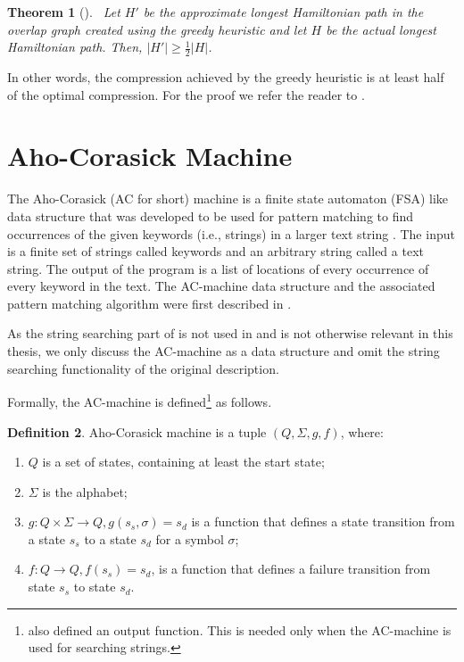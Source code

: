 \documentclass[english,twoside,censored,csm,algorithms-track-2020]{HYthesisML}
\theoremstyle{plain}
\newtheorem{theorem}{Theorem}[chapter]
\theoremstyle{definition}
\newtheorem{definition}[theorem]{Definition}
\numberwithin{testexample}{chapter}
\begin{document}
\begin{theorem}[]~\label{theorem-heuristic-bound}
  Let $H'$ be the approximate longest Hamiltonian path in the overlap graph created using
  the greedy heuristic and let $H$ be the actual longest Hamiltonian path. Then,
  $|H'|\geq \frac{1}{2}|H|$.
  
\end{theorem}

In other words, the compression achieved by the greedy heuristic is at least half of the optimal
compression. 
For the proof we refer the reader to \citep{Tarhio88}.




\section{Aho-Corasick Machine}


  
The Aho-Corasick (AC for short) machine is a finite state automaton (FSA) like data structure that was
developed to be used
for pattern matching to find occurrences of the given keywords (i.e., strings) in a larger text string \citep{Aho75}.
The input is a finite set of strings called keywords and an
arbitrary string called a text string. The output of the program is a list of locations of every
occurrence of every keyword in the text. The AC-machine data structure and the associated pattern
matching algorithm were first described in \citep{Aho75}.

As the string searching part of \citep{Aho75} is not used in \citep{Ukkonen90} and is not otherwise
relevant in this thesis, we only discuss the AC-machine as a data structure and omit the string searching
functionality of the original description.

Formally, the AC-machine is defined\footnote{\citep{Aho75} also defined an output function.
This is needed only when the AC-machine is used for searching strings.} as follows.

\begin{definition}
  Aho-Corasick machine is a tuple $(Q, \Sigma, g, f)$, where:
\begin{enumerate}[leftmargin=28pt]
\item $Q$ is a set of states, containing at least the start state;
\item $\Sigma$ is the alphabet;
\item $g : Q \times \Sigma \rightarrow Q, g(s_s,\sigma) = s_d$ is a function that defines a state transition from a state $s_s$ to a state $s_d$ for a symbol $\sigma$;
\item $f : Q \rightarrow Q, f(s_s) = s_d$, is a function that defines a failure transition from state $s_s$ to state $s_d$.
\end{enumerate}
\end{definition}
\end{document}
